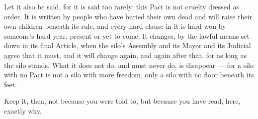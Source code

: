 Let it also be said, for it is said too rarely: this Pact is not cruelty dressed as order. It is written by people who have buried their own dead and will raise their own children beneath its rule, and every hard clause in it is hard-won by someone's hard year, present or yet to come. It changes, by the lawful means set down in its final Article, when the silo's Assembly and its Mayor and its Judicial agree that it must, and it will change again, and again after that, for as long as the silo stands. What it does not do, and must never do, is disappear --- for a silo with no Pact is not a silo with more freedom, only a silo with no floor beneath its feet.

Keep it, then, not because you were told to, but because you have read, here, exactly why.
